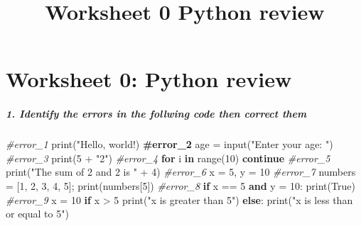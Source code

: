 \documentclass[11pt]{article}
\title{Worksheet 0 Python review}
\date{}
\newenvironment{Shaded}{}{}
\newcommand{\KeywordTok}[1]{\textcolor[rgb]{0.00,0.44,0.13}{\textbf{{#1}}}}
\newcommand{\DecValTok}[1]{\textcolor[rgb]{0.25,0.63,0.44}{{#1}}}
\newcommand{\StringTok}[1]{\textcolor[rgb]{0.25,0.44,0.63}{{#1}}}
\newcommand{\CommentTok}[1]{\textcolor[rgb]{0.38,0.63,0.69}{\textit{{#1}}}}
\newcommand{\ErrorTok}[1]{\textcolor[rgb]{1.00,0.00,0.00}{\textbf{{#1}}}}
\newcommand{\NormalTok}[1]{{#1}}
\newcommand{\VariableTok}[1]{\textcolor[rgb]{0.10,0.09,0.49}{{#1}}}
\newcommand{\ControlFlowTok}[1]{\textcolor[rgb]{0.00,0.44,0.13}{\textbf{{#1}}}}
\newcommand{\OperatorTok}[1]{\textcolor[rgb]{0.40,0.40,0.40}{{#1}}}
\newcommand{\BuiltInTok}[1]{{#1}}
\begin{document}
    
    \maketitle
    
    

    
    \hypertarget{worksheet-0-python-review}{%
\section{Worksheet 0: Python review}\label{worksheet-0-python-review}}

\hypertarget{identify-the-errors-in-the-follwing-code-then-correct-them}{%
\subparagraph{1. Identify the errors in the follwing code then correct
them}\label{identify-the-errors-in-the-follwing-code-then-correct-them}}

\begin{Shaded}
\begin{Highlighting}[]
\CommentTok{\#error\_1}
\BuiltInTok{print}\NormalTok{(}\StringTok{"Hello, world!)}
\ErrorTok{\#error\_2}
\NormalTok{age }\OperatorTok{=} \BuiltInTok{input}\NormalTok{(}\StringTok{"Enter your age: "}\NormalTok{)}
\CommentTok{\#error\_3}
\BuiltInTok{print}\NormalTok{(}\DecValTok{5} \OperatorTok{+} \StringTok{"2"}\NormalTok{)}
\CommentTok{\#error\_4}
\ControlFlowTok{for}\NormalTok{ i }\KeywordTok{in} \BuiltInTok{range}\NormalTok{(}\DecValTok{10}\NormalTok{)}
    \ControlFlowTok{continue}
\CommentTok{\#error\_5}
\BuiltInTok{print}\NormalTok{(}\StringTok{"The sum of 2 and 2 is "} \OperatorTok{+} \DecValTok{4}\NormalTok{)}
\CommentTok{\#error\_6}
\NormalTok{x }\OperatorTok{=} \DecValTok{5}\NormalTok{, y }\OperatorTok{=} \DecValTok{10}
\CommentTok{\#error\_7}
\NormalTok{numbers }\OperatorTok{=}\NormalTok{ [}\DecValTok{1}\NormalTok{, }\DecValTok{2}\NormalTok{, }\DecValTok{3}\NormalTok{, }\DecValTok{4}\NormalTok{, }\DecValTok{5}\NormalTok{]}\OperatorTok{;} \BuiltInTok{print}\NormalTok{(numbers[}\DecValTok{5}\NormalTok{])}
\CommentTok{\#error\_8}
\ControlFlowTok{if}\NormalTok{ x }\OperatorTok{==} \DecValTok{5} \KeywordTok{and}\NormalTok{ y }\OperatorTok{=} \DecValTok{10}\NormalTok{:}
    \BuiltInTok{print}\NormalTok{(}\VariableTok{True}\NormalTok{)}
\CommentTok{\#error\_9}
\NormalTok{x }\OperatorTok{=} \DecValTok{10}
\ControlFlowTok{if}\NormalTok{ x }\OperatorTok{\textgreater{}} \DecValTok{5}
    \BuiltInTok{print}\NormalTok{(}\StringTok{"x is greater than 5"}\NormalTok{)}
\ControlFlowTok{else}\NormalTok{:}
    \BuiltInTok{print}\NormalTok{(}\StringTok{"x is less than or equal to 5"}\NormalTok{)}
\end{Highlighting}
\end{Shaded}
\end{document}
